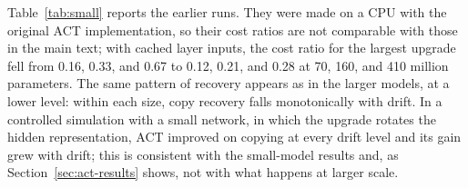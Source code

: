 \documentclass[preprint,12pt,authoryear]{elsarticle}
\begin{document}
Table~\ref{tab:small} reports the earlier runs. They were made on a CPU with the original ACT implementation, so their cost ratios are not comparable with those in the main text; with cached layer inputs, the cost ratio for the largest upgrade fell from 0.16, 0.33, and 0.67 to 0.12, 0.21, and 0.28 at 70, 160, and 410 million parameters. The same pattern of recovery appears as in the larger models, at a lower level: within each size, copy recovery falls monotonically with drift. In a controlled simulation with a small network, in which the upgrade rotates the hidden representation, ACT improved on copying at every drift level and its gain grew with drift; this is consistent with the small-model results and, as Section~\ref{sec:act-results} shows, not with what happens at larger scale.




\end{document}
